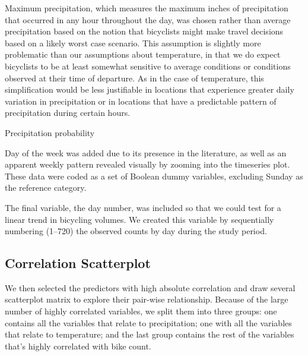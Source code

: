 \documentclass [11pt, proquest] {uwthesis}[2015/03/03]
\begin{document}
Maximum precipitation, which measures the maximum inches of
precipitation that occurred in any hour throughout the day, was chosen
rather than average precipitation based on the notion that bicyclists
might make travel decisions based on a likely worst case scenario.
This assumption is slightly more problematic than our assumptions
about temperature, in that we do expect bicyclists to be at least
somewhat sensitive to average conditions or conditions observed at
their time of departure. As in the case of temperature, this
simplification would be less justifiable in locations that experience
greater daily variation in precipitation or in locations that have a
predictable pattern of precipitation during certain hours.

Precipitation probability 

Day of the week was added due to its presence in the literature, as
well as an apparent weekly pattern revealed visually by zooming into
the timeseries plot. These data were coded as a set of Boolean dummy
variables, excluding Sunday as the reference category.

The final variable, the day number, was included so that we could test
for a linear trend in bicycling volumes. We created this variable by
sequentially numbering (1--720) the observed counts by day during the
study period.

\subsection{Correlation Scatterplot}

We then selected the predictors with high absolute correlation and draw several scatterplot matrix to explore their pair-wise relationship. Because of the large number of highly correlated variables, we split them into three groups: one contains all the variables that relate to precipitation; one with all the variables that relate to temperature; and the last group contains the rest of the variables that's highly correlated with bike count.
\end{document}
